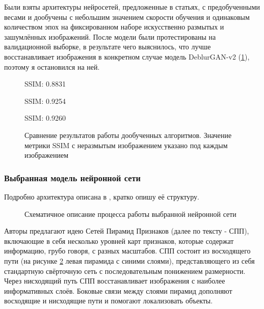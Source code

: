 Были взяты архитектуры нейросетей, предложенные в статьях, с предобученными весами и дообучены с небольшим значением скорости обучения и одинаковым количеством эпох на фиксированном наборе искусственно размытых и зашумлённых изображений. После модели были протестированы на валидационной выборке, в результате чего выяснилось, что лучше восстанавливает изображения в конкретном случае модель DeblurGAN-v2 (\ref{ris:dif_nn}), поэтому я остановился на ней.


\begin{figure}[H]
\begin{minipage}[t]{0.3\linewidth}
\cite{jin} SSIM: 0.8831 \\ 
\end{minipage}
\hfill
\begin{minipage}[t]{0.3\linewidth}
\cite{srn} SSIM: 0.9254 \\ 
\end{minipage}
\hfill
\begin{minipage}[t]{0.3\linewidth}
\cite{dganv2} SSIM: 0.9260 \\ 
\end{minipage}
\caption{ Сравнение результатов работы дообученных алгоритмов. Значение метрики SSIM с неразмытым изображением указано под каждым изображением }
\label{ris:dif_nn}
\end{figure}

\subsubsection{ Выбранная модель нейронной сети}

Подробно архитектура описана в \cite{dganv2}, кратко опишу её структуру.

\begin{figure}[H]
\begin{minipage}[h]{1\linewidth}
\end{minipage}
\caption{ Схематичное описание процесса работы выбранной нейронной сети }
\label{ris:dgan_arch}
\end{figure}

Авторы предлагают идею Сетей Пирамид Признаков (далее по тексту - СПП), включающие в себя несколько уровней карт признаков, которые содержат информацию, грубо говоря, с разных масштабов. СПП состоит из восходящего пути (на рисунке \ref{ris:dgan_arch} левая пирамида с синими слоями), представляющего из себя стандартную свёрточную сеть с последовательным понижением размерности. Через нисходящий путь СПП восстанавливает изображения с наиболее информативных слоёв. Боковые связи между слоями пирамид дополняют восходящие и нисходящие пути и помогают локализовать объекты.

